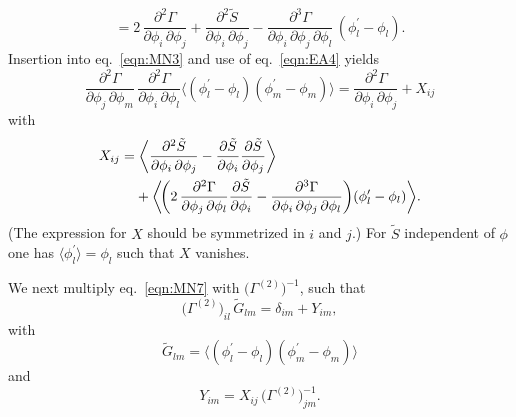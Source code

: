 \documentclass[twocolumn,aps,prd,amsmath,amssymb,preprintnumbers,longbibliography]{revtex4-1}
\numberwithin{equation}{section}
\begin{document}
\begin{appendices}
\begin{equation}
	= 2 \, \frac{\partial^2 \Gamma}{\partial \phi_i \, \partial \phi_j} + \frac{\partial^2 \tilde{S}}{\partial \phi_i \, \partial \phi_j} - \frac{\partial^3 \Gamma}{\partial \phi_i \, \partial \phi_j \, \partial \phi_l} \, (\phi_l^\prime - \phi_l).
\end{equation}
Insertion into eq.~\eqref{eqn:MN3} and use of eq.~\eqref{eqn:EA4} yields
\begin{equation}\label{eqn:MN7}
	\frac{\partial^2 \Gamma}{\partial \phi_j \, \partial \phi_m} \, \frac{\partial^2 \Gamma}{\partial \phi_i \, \partial \phi_l} \langle(\phi_l^\prime - \phi_l) (\phi_m^\prime - \phi_m)\rangle
	= \frac{\partial^2 \Gamma}{\partial \phi_i \, \partial \phi_j} + X_{ij}
\end{equation}
with
\begin{align}\label{eqn:MN8}
	X_{ij}
	&= \biggl\langle\frac{\partial^2 \tilde{S}}{\partial \phi_i \, \partial \phi_j} - \frac{\partial \tilde{S}}{\partial \phi_i} \frac{\partial \tilde{S}}{\partial \phi_j}\biggr\rangle\\
	&\hphantom{{}=}+ \biggl\langle\!\biggl(2 \, \frac{\partial^2 \Gamma}{\partial \phi_j \, \partial \phi_l} \frac{\partial \tilde{S}}{\partial \phi_i} - \frac{\partial^3 \Gamma}{\partial \phi_i \, \partial \phi_j \, \partial \phi_l}\biggr) (\phi_l^\prime - \phi_l)\biggr\rangle.\notag
\end{align}
(The expression for $X$ should be symmetrized in $i$ and $j$.) For $\tilde{S}$ independent of $\phi$ one has $\langle \phi_l^\prime\rangle = \phi_l$ such that $X$ vanishes.

We next multiply eq.~\eqref{eqn:MN7} with $\bigl(\Gamma^{(2)}\bigr)^{-1}$, such that
\begin{equation}\label{eqn:MN9}
	\bigl(\Gamma^{(2)}\bigr)_{il} \, \tilde{G}_{lm}
	= \delta_{im} + Y_{im},
\end{equation}
with
\begin{equation}\label{eqn:MN10}
	\tilde{G}_{lm}
	= \langle(\phi_l^\prime - \phi_l) (\phi_m^\prime - \phi_m)\rangle
\end{equation}
and
\begin{equation}\label{eqn:MN11}
	Y_{im}
	= X_{ij} \, \bigl(\Gamma^{(2)}\bigr)_{jm}^{-1}.
\end{equation}


\end{appendices}
\end{document}
